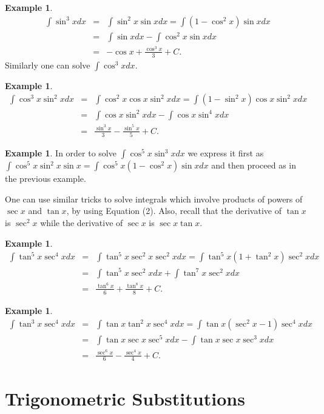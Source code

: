 \documentclass[12pt]{article}
\theoremstyle{definition}
\newtheorem{exa}[thm]{Example}
\begin{document}
\begin{exa}
\begin{eqnarray*}
\int \sin^3 x dx &=& \int \sin^2x\sin x dx=\int(1-\cos^2 x)\sin x
dx\\
&=& \int \sin x dx - \int \cos^2 x \sin x dx\\
&=& -\cos x + \frac{\cos^3 x}{3} + C.
\end{eqnarray*}
Similarly one can solve $\int \cos^3 x dx$.
\end{exa}
\begin{exa}
\begin{eqnarray*}
\int \cos^3x\sin^2 x dx &=& \int \cos^2 x \cos x \sin^2x dx = \int
(1-\sin^2x)\cos x \sin^2 x dx\\
&=& \int \cos x \sin^2 x dx - \int \cos x \sin^4 x dx\\
&=& \frac{\sin^3 x}{3} - \frac{\sin^5 x}{5} + C.
\end{eqnarray*}
\end{exa}
\begin{exa}
In order to solve $\int \cos^5 x \sin^3 x dx$ we express it first
as $\int \cos^5x \sin^2 x \sin x=\int \cos^5 x (1-\cos^2x)\sin x
dx$ and then proceed as in the previous example.
\end{exa}
One can use similar tricks to solve integrals which involve
products of powers of $\sec x $ and $\tan x$, by using Equation
(2). Also, recall that the derivative of $\tan x$ is $\sec^2 x$
while the derivative of $\sec x$ is $\sec x \tan x$.
\begin{exa}
\begin{eqnarray*}
\int \tan^5x\sec^4 x dx &=& \int \tan^5 x \sec^2 x \sec^2x dx =
\int
\tan^5 x(1+\tan^2x)\sec^2 x dx\\
&=& \int \tan^5 x \sec^2 x dx + \int \tan^7 x \sec^2 x dx\\
&=& \frac{\tan^6 x}{6} + \frac{\tan^8 x}{8} + C.
\end{eqnarray*}
\end{exa}
\begin{exa}
\begin{eqnarray*}
\int \tan^3x\sec^4 x dx &=& \int \tan x \tan^2 x \sec^4x dx = \int
\tan x(\sec^2x-1)\sec^4 x dx\\
&=& \int \tan x \sec x \sec^5 x dx - \int \tan x \sec x\sec^3 x dx\\
&=& \frac{\sec^6 x}{6} - \frac{\sec^4 x}{4} + C.
\end{eqnarray*}
\end{exa}

\section{Trigonometric Substitutions}
\end{document}
